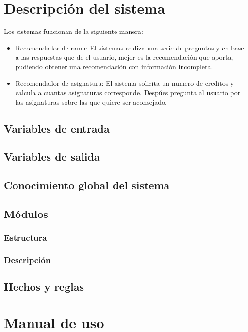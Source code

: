 \chapter{Descripción del sistema}
Los sistemas funcionan de la siguiente manera:
\begin{itemize}
   \item Recomendador de rama: El sistemas realiza una serie de preguntas y en base a las respuestas que de el usuario, mejor es la recomendación que aporta, pudiendo obtener una recomendación con información incompleta.
   \item Recomendador de asignatura: El sistema solicita un numero de creditos y calcula a cuantas asignaturas corresponde. Despúes pregunta al usuario por las asignaturas sobre las que quiere ser aconsejado. 
\end{itemize}
\section{Variables de entrada}
\section{Variables de salida}
\section{Conocimiento global del sistema}
\section{Módulos}
\subsection{Estructura}
\subsection{Descripción}
\section{Hechos y reglas}


\chapter{Manual de uso}
